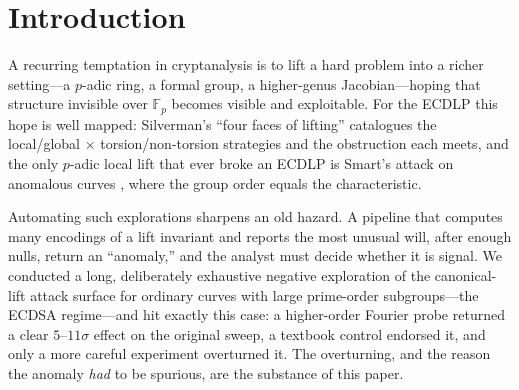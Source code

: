 \documentclass[11pt]{article}
\theoremstyle{definition}
\newcommand{\Fp}{\mathbb{F}_p}
\begin{document}
\section{Introduction}

A recurring temptation in cryptanalysis is to lift a hard problem into a
richer setting---a $p$-adic ring, a formal group, a higher-genus
Jacobian---hoping that structure invisible over $\Fp$ becomes visible and
exploitable. For the ECDLP this hope is well mapped: Silverman's ``four
faces of lifting'' \cite{silvermanlift,silverman4faces} catalogues the
local/global $\times$ torsion/non-torsion strategies and the obstruction
each meets, and the only $p$-adic local lift that ever broke an ECDLP is
Smart's attack on anomalous curves \cite{smart,satoharaki,semaev}, where
the group order equals the characteristic.

Automating such explorations sharpens an old hazard. A pipeline that
computes many encodings of a lift invariant and reports the most unusual
will, after enough nulls, return an ``anomaly,'' and the analyst must
decide whether it is signal. We conducted a long, deliberately exhaustive
negative exploration of the canonical-lift attack surface for ordinary
curves with large prime-order subgroups---the ECDSA regime---and hit
exactly this case: a higher-order Fourier probe returned a clear
$5$--$11\sigma$ effect on the original sweep, a textbook control endorsed
it, and only a more careful experiment overturned it. The overturning, and the reason the
anomaly \emph{had} to be spurious, are the substance of this paper.
\end{document}
